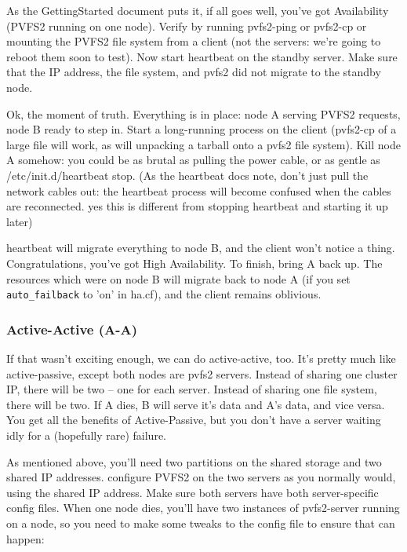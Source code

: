 \documentclass[11pt]{article}
\begin{document}
As the GettingStarted document puts it, if all goes well, you've got
Availability (PVFS2 running on one node).  Verify by running pvfs2-ping
or pvfs2-cp or mounting the PVFS2 file system from a client (not the
servers: we're going to reboot them soon to test).  Now start heartbeat
on the standby server.  Make sure that the IP address, the file system,
and pvfs2 did not migrate to the standby node.  

Ok, the moment of truth.  Everything is in place: node A serving PVFS2
requests, node B ready to step in.  Start a long-running process on the
client (pvfs2-cp of a large file will work, as will unpacking a tarball
onto a pvfs2 file system).  Kill node A somehow:  you could be as brutal
as pulling the power cable, or as gentle as /etc/init.d/heartbeat stop.
(As the heartbeat docs note, don't just pull the network cables out: the
heartbeat process will become confused when the cables are reconnected.
yes this is different from stopping heartbeat and starting it up later)

heartbeat will migrate everything to node B, and the client won't notice
a thing.   Congratulations, you've got High Availability.  To finish,
bring A back up.  The resources which were on node B will migrate back
to node A (if you set \texttt{auto\_failback} to 'on' in ha.cf), and the client
remains oblivious.

\subsubsection{Active-Active (A-A)}

If that wasn't exciting enough, we can do active-active, too.  It's
pretty much like active-passive, except both nodes are pvfs2 servers.
Instead of sharing one cluster IP, there will be two -- one for each
server.  Instead of sharing one file system, there will be two.  If A
dies, B will serve it's data and A's data, and vice versa.  You get all
the benefits of Active-Passive, but you don't have a server waiting idly
for a (hopefully rare) failure.

As mentioned above, you'll need two partitions on the shared storage and
two shared IP addresses.  configure PVFS2 on the two servers as you
normally would, using the shared IP address.  Make sure both servers
have both server-specific config files.  When one node dies, you'll have
two instances of pvfs2-server running on a node, so you need to make
some tweaks to the config file to ensure that can happen: 
\end{document}
